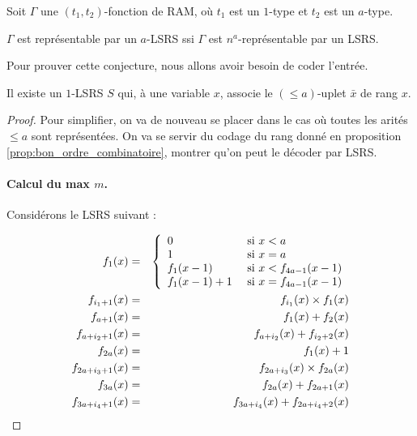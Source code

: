 \documentclass{report}
\newcommand{\leqa}{\left( \leqslant a \right)}
\begin{document}
	\begin{conj}
		Soit $\Gamma$ une $(t_1,t_2)$-fonction de RAM, où $t_1$ est un $1$-type et $t_2$ est un $a$-type.
		
		$\Gamma$ est représentable par un $a$-LSRS ssi $\Gamma$ est $n^a$-représentable par un LSRS.
	\end{conj}
		
	Pour prouver cette conjecture, nous allons avoir besoin de coder l'entrée.
	
	\begin{lemma}
		\label{lem:decomp_rang_par_LSRS}
		
		Il existe un $1$-LSRS $S$ qui, à une variable $x$, associe le $\leqa$-uplet $\bar{x}$ de rang $x$. 
	\end{lemma}
		
	\begin{proof}
		Pour simplifier, on va de nouveau se placer dans le cas où toutes les arités $\leqslant a$ sont représentées\footnotemark. On va se servir du codage du rang donné en proposition \ref{prop:bon_ordre_combinatoire}, montrer qu'on peut le décoder par LSRS.
		
			
		\paragraph{Calcul du max $m$.}
			\label{par:calcul_max_bon_ordre}
			Considérons le LSRS suivant :
			
				\begin{eqnarray}
					f_1(x) & = & \left\lbrace \begin{array}{ll} 	
									0 & \text{ si $x < a$} \\
									1 & \text{ si $x = a$} \\
									f_1(x-1) & \text{ si $x < f_{4a-1}(x-1)$} \\
									f_1(x-1)+1 & \text{ si $x = f_{4a-1}(x-1)$}
									 \end{array} \right. 
									\label{eqn:f_0_max_courant}\\
					f_{i_1 + 1}(x) & = & f_{i_1}(x) \times f_1(x) \label{eqn:m_pow_i}\\
					f_{a + 1}(x) & = & f_{1}(x) + f_{2}(x) \label{eqn:sum_m_pow_init}\\
					f_{a + i_2 + 1}(x) & = & f_{a + i_2}(x) + f_{i_2 + 2}(x) \label{eqn:sum_m_pow}\\
					f_{2a}(x) & = & f_1(x) + 1 \label{eqn:m_plus_1}\\
					f_{2a + i_3 + 1}(x) & = & f_{2a + i_3}(x) \times f_{2a}(x) \label{eqn:m1_pow_i}\\
					f_{3a}(x) & = & f_{2a}(x) + f_{2a + 1}(x) \label{eqn:sum_m1_pow_init}\\
					f_{3a + i_4 + 1}(x) & = & f_{3a + i_4}(x) + f_{2a + i_4+2}(x) \label{eqn:sum_m1_pow}
				\end{eqnarray}
		

\end{proof}
\end{document}
